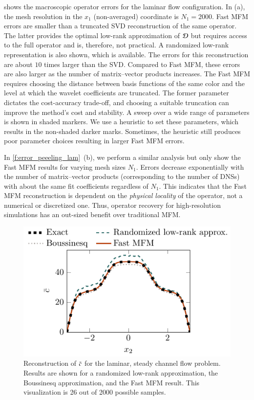  shows the macroscopic operator errors for the laminar flow configuration.
In (a), the mesh resolution in the $x_1$ (non-averaged) coordinate is $N_1 = 2000$.
Fast MFM errors are smaller than a truncated SVD reconstruction of the same operator. 
The latter provides the optimal low-rank approximation of $\mathcal{D}$ but requires access to the full operator and is, therefore, not practical.
A randomized low-rank representation is also shown, which is available.
The errors for this reconstruction are about $10$ times larger than the SVD.
Compared to Fast MFM, these errors are also larger as the number of matrix--vector products increases.
The Fast MFM requires choosing the distance between basis functions of the same color and the level at which the wavelet coefficients are truncated. 
The former parameter dictates the cost-accuracy trade-off, and choosing a suitable truncation can improve the method's cost and stability.
A sweep over a wide range of parameters is shown in shaded markers.
We use a heuristic to set these parameters, which results in the non-shaded darker marks. 
Sometimes, the heuristic still produces poor parameter choices resulting in larger Fast MFM errors.

In \cref{f:error_peeeling_lam}~(b), we perform a similar analysis but only show the Fast MFM results for varying mesh sizes $N_1$.
Errors decrease exponentially with the number of matrix--vector products (corresponding to the number of DNSs) with about the same fit coefficients regardless of $N_1$.
This indicates that the Fast MFM reconstruction is dependent on the \textit{physical locality} of the operator, not a numerical or discretized one. 
Thus, operator recovery for high-resolution simulations has an out-sized benefit over traditional MFM. 

\begin{figure}
    \centering
    \includegraphics[scale=1]{figures/laminar-reconstructions.pdf}
    \caption{
        Reconstruction of $\bar{c}$ for the laminar, steady channel flow problem. 
        Results are shown for a randomized low-rank approximation, the Boussinesq approximation, and the Fast MFM result. 
        This visualization is 26 out of 2000 possible samples.
    }
    \label{f:lam-reconstructions}
\end{figure}

